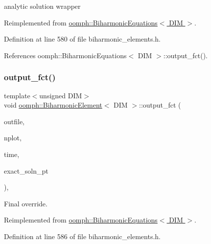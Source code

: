 analytic solution wrapper 



Reimplemented from \hyperlink{classoomph_1_1BiharmonicEquations_aca4e6ea18f47696a4535dfc4e020ee64}{oomph\+::\+Biharmonic\+Equations$<$ D\+I\+M $>$}.



Definition at line 580 of file biharmonic\+\_\+elements.\+h.



References oomph\+::\+Biharmonic\+Equations$<$ D\+I\+M $>$\+::output\+\_\+fct().

\mbox{\label{classoomph_1_1BiharmonicElement_ad8a8d7e9f534480b7acf45716dc62721}} 
\subsubsection{\texorpdfstring{output\+\_\+fct()}{output\_fct()}\hspace{0.1cm}{\footnotesize\ttfamily [2/2]}}
{\footnotesize\ttfamily template$<$unsigned D\+IM$>$ \\
void \hyperlink{classoomph_1_1BiharmonicElement}{oomph\+::\+Biharmonic\+Element}$<$ D\+IM $>$\+::output\+\_\+fct (\begin{DoxyParamCaption}\item[{std\+::ostream \&}]{outfile,  }\item[{const unsigned \&}]{nplot,  }\item[{const double \&}]{time,  }\item[{\hyperlink{classoomph_1_1FiniteElement_ad4ecf2b61b158a4b4d351a60d23c633e}{Finite\+Element\+::\+Unsteady\+Exact\+Solution\+Fct\+Pt}}]{exact\+\_\+soln\+\_\+pt }\end{DoxyParamCaption})\hspace{0.3cm}{\ttfamily [inline]}, {\ttfamily [virtual]}}



Final override. 



Reimplemented from \hyperlink{classoomph_1_1BiharmonicEquations_a4899086db9350750d873a076a75d150d}{oomph\+::\+Biharmonic\+Equations$<$ D\+I\+M $>$}.



Definition at line 586 of file biharmonic\+\_\+elements.\+h.



